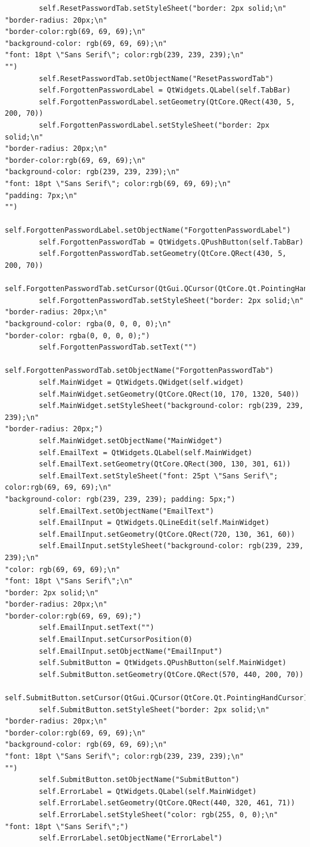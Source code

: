 \documentclass{article}
\begin{document}
\begin{lstlisting}
        self.ResetPasswordTab.setStyleSheet("border: 2px solid;\n"
"border-radius: 20px;\n"
"border-color:rgb(69, 69, 69);\n"
"background-color: rgb(69, 69, 69);\n"
"font: 18pt \"Sans Serif\"; color:rgb(239, 239, 239);\n"
"")
        self.ResetPasswordTab.setObjectName("ResetPasswordTab")
        self.ForgottenPasswordLabel = QtWidgets.QLabel(self.TabBar)
        self.ForgottenPasswordLabel.setGeometry(QtCore.QRect(430, 5, 200, 70))
        self.ForgottenPasswordLabel.setStyleSheet("border: 2px solid;\n"
"border-radius: 20px;\n"
"border-color:rgb(69, 69, 69);\n"
"background-color: rgb(239, 239, 239);\n"
"font: 18pt \"Sans Serif\"; color:rgb(69, 69, 69);\n"
"padding: 7px;\n"
"")
        self.ForgottenPasswordLabel.setObjectName("ForgottenPasswordLabel")
        self.ForgottenPasswordTab = QtWidgets.QPushButton(self.TabBar)
        self.ForgottenPasswordTab.setGeometry(QtCore.QRect(430, 5, 200, 70))
        self.ForgottenPasswordTab.setCursor(QtGui.QCursor(QtCore.Qt.PointingHandCursor))
        self.ForgottenPasswordTab.setStyleSheet("border: 2px solid;\n"
"border-radius: 20px;\n"
"background-color: rgba(0, 0, 0, 0);\n"
"border-color: rgba(0, 0, 0, 0);")
        self.ForgottenPasswordTab.setText("")
        self.ForgottenPasswordTab.setObjectName("ForgottenPasswordTab")
        self.MainWidget = QtWidgets.QWidget(self.widget)
        self.MainWidget.setGeometry(QtCore.QRect(10, 170, 1320, 540))
        self.MainWidget.setStyleSheet("background-color: rgb(239, 239, 239);\n"
"border-radius: 20px;")
        self.MainWidget.setObjectName("MainWidget")
        self.EmailText = QtWidgets.QLabel(self.MainWidget)
        self.EmailText.setGeometry(QtCore.QRect(300, 130, 301, 61))
        self.EmailText.setStyleSheet("font: 25pt \"Sans Serif\"; color:rgb(69, 69, 69);\n"
"background-color: rgb(239, 239, 239); padding: 5px;")
        self.EmailText.setObjectName("EmailText")
        self.EmailInput = QtWidgets.QLineEdit(self.MainWidget)
        self.EmailInput.setGeometry(QtCore.QRect(720, 130, 361, 60))
        self.EmailInput.setStyleSheet("background-color: rgb(239, 239, 239);\n"
"color: rgb(69, 69, 69);\n"
"font: 18pt \"Sans Serif\";\n"
"border: 2px solid;\n"
"border-radius: 20px;\n"
"border-color:rgb(69, 69, 69);")
        self.EmailInput.setText("")
        self.EmailInput.setCursorPosition(0)
        self.EmailInput.setObjectName("EmailInput")
        self.SubmitButton = QtWidgets.QPushButton(self.MainWidget)
        self.SubmitButton.setGeometry(QtCore.QRect(570, 440, 200, 70))
        self.SubmitButton.setCursor(QtGui.QCursor(QtCore.Qt.PointingHandCursor))
        self.SubmitButton.setStyleSheet("border: 2px solid;\n"
"border-radius: 20px;\n"
"border-color:rgb(69, 69, 69);\n"
"background-color: rgb(69, 69, 69);\n"
"font: 18pt \"Sans Serif\"; color:rgb(239, 239, 239);\n"
"")
        self.SubmitButton.setObjectName("SubmitButton")
        self.ErrorLabel = QtWidgets.QLabel(self.MainWidget)
        self.ErrorLabel.setGeometry(QtCore.QRect(440, 320, 461, 71))
        self.ErrorLabel.setStyleSheet("color: rgb(255, 0, 0);\n"
"font: 18pt \"Sans Serif\";")
        self.ErrorLabel.setObjectName("ErrorLabel")


\end{lstlisting}
\end{document}
